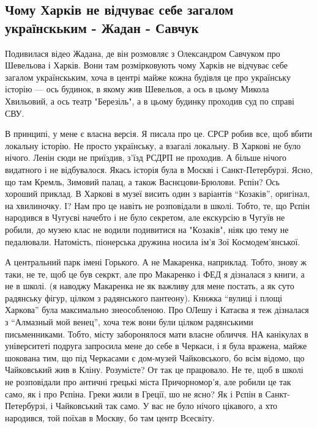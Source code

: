  
 
 
 
 
\subsection{Чому Харків не відчуває себе загалом українскьким - Жадан - Савчук}

Подивилася відео Жадана, де він розмовляє з Олександром Савчуком про Шевельова
і Харків. Вони там розмірковують чому Харків не відчуває себе загалом
українскьким, хоча в центрі майже кожна будівля це про українську історію — ось
будинок, в якому жив Шевельов, а ось в цьому Микола Хвильовий, а ось театр
"Березіль", а в цьому будинку проходив суд по справі СВУ.  

В принципі, у мене є
власна версія. Я писала про це. СРСР робив все, щоб вбити локальну історію. Не
просто українську, а взагалі локальну. В Харкові не було нічого. Ленін сюди не
приїздив, з'їзд РСДРП не проходив. А більше нічого видатного і не відбувалося.
Якась історія була в Москві і Санкт-Петербурзі. Ясно, що там Кремль, Зимовий
палац, а також Васнєцови-Брюлови. Рєпін? Ось хороший приклад. В Харкові в музеї
висить один з варіантів \enquote{Козаків}, оригінал, на хвилиночку. І? Нам про це
навіть не розповідали в школі. Тобто, те, що Рєпін народився в Чугуєві начебто
і не було секретом, але екскурсію в Чугуїв не робили, до музею клас не водили
подивитися на "Козаків", ніяк цю тему не педалювали. Натомість, піонерська
дружина носила ім'я Зої Космодем'янської. 

А центральний парк імені Горького. А
не Макаренка, наприклад. Тобто, знову ж таки, не те, щоб це був секркт, але про
Макаренко і ФЕД я дізналася з книги, а не в школі. (я наводжу Макаренка не як
важливу для мене постать, а як суто радянську фігур, цілком з радянського
пантеону). Книжка \enquote{вулиці і площі Харкова} була максимально знеособленою. Про
ОЛешу і Катаєва я теж дізналася з \enquote{Алмазный мой венец}, хоча теж вони були
цілком радянськими письменниками. Тобто, місту заборонялося мати власне
обличчя. НА канікулах в університеті подруга запросила мене до себе в Черкаси,
і я була вражена, майже шокована тим, що під Черкасами є дом-музей
Чайковського, бо всім відомо, що Чайковський жив в Кліну. Розумієте? От так це
працювало. Не те, щоб в школі не розповідали про античні грецькі міста
Причорномор'я, але робили це так само, як і про Рєпіна. Греки жили в Греції, шо
не ясно? Як і Рєпін в Санкт-Петербурзі, і Чайковський так само. У вас не було
нічого цікавого, а хто народився, той поїхав в Москву, бо там центр Всесвіту. 

